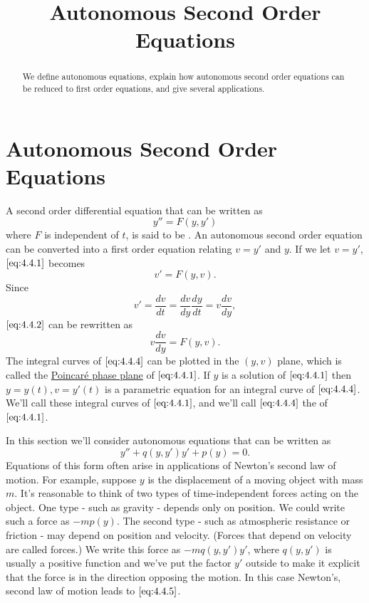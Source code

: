 \documentclass{ximera}
\title{Autonomous Second Order Equations}%
\begin{document}
 
\begin{abstract}
 We define autonomous equations, explain how autonomous second order equations can be reduced to first order equations, and give several applications.
\end{abstract}
 
\maketitle
 
\section*{Autonomous Second Order Equations}
 
A second order differential equation that can be written as
\begin{equation}\label{eq:4.4.1}
y''=F(y,y')
\end{equation}
where $F$ is independent of $t$, is said to be .
An autonomous second order equation can be converted into a first
order equation relating $v=y'$ and $y$. If we let $v=y'$,
$\eqref{eq:4.4.1}$ becomes
\begin{equation}\label{eq:4.4.2}
v'=F(y,v).
\end{equation}
Since
\begin{equation}\label{eq:4.4.3}
v'=\frac{dv}{dt}=\frac{dv}{dy}\frac{dy}{dt}=v\frac{dv}{dy},
\end{equation}
$\eqref{eq:4.4.2}$ can be rewritten as
\begin{equation}\label{eq:4.4.4}
v\frac{dv}{dy}=F(y,v).
\end{equation}
The integral curves of $\eqref{eq:4.4.4}$ can be plotted in the $(y,v)$
plane, which is called the
\href{https://en.wikipedia.org/wiki/Phase_plane}{Poincar\'e phase plane} of $\eqref{eq:4.4.1}$. If $y$ is a solution of
$\eqref{eq:4.4.1}$
then $y=y(t), v=y'(t)$ is a parametric equation for an integral curve
of $\eqref{eq:4.4.4}$. We'll call these integral curves  of $\eqref{eq:4.4.1}$, and we'll call
$\eqref{eq:4.4.4}$ the  of $\eqref{eq:4.4.1}$.
 
In this section we'll consider  autonomous equations
that can be written as
\begin{equation}\label{eq:4.4.5}
y''+q(y,y')y'+p(y)=0.
\end{equation}
Equations of this form often arise in applications of Newton's second
law of motion. For example, suppose  $y$ is the displacement of a
moving object with mass $m$. It's  reasonable to think of two
types of time-independent forces acting on the object. One type - such
as gravity - depends only on position. We could write such a force as
$-mp(y)$. The second type - such as atmospheric resistance or friction
- may depend on position and velocity. (Forces that depend on velocity
are called  forces.) We  write this force as
$-mq(y,y')y'$, where $q(y,y')$ is usually a positive function and
we've put the factor $y'$ outside  to make it
explicit that the force
is in the direction opposing the motion. In this case Newton's, second
law of motion leads to $\eqref{eq:4.4.5}$.
 
\end{document}
